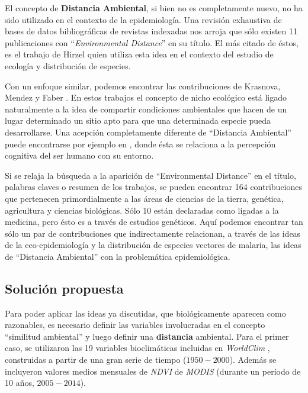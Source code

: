  \par El concepto de \textbf{Distancia Ambiental}, si bien no es completamente nuevo,
    no ha sido utilizado en el contexto de la epidemiología. Una revisión
    exhaustiva de bases de datos bibliográficas de revistas indexadas nos
    arroja que sólo existen 11 publicaciones con ``\textit{Environmental Distance}”
    en su título. El más citado de éstos, es el trabajo de Hirzel \cite{hirzel_distance}
    quien utiliza esta idea en el contexto del estudio de ecología y
    distribución de especies.

  \par Con un enfoque similar, podemos encontrar las contribuciones de Krasnova,
    Mendez y Faber \cite{krasnova_similarity, mendez_distance, farber_modeling}.
    En estos trabajos el concepto de nicho ecológico está ligado naturalmente a
    la idea de compartir condiciones ambientales que hacen de un lugar determinado
    un sitio apto para que una determinada especie pueda desarrollarse.
    Una acepción completamente diferente de ``Distancia Ambiental” puede
    encontrarse por ejemplo en \cite{montello_cognition}, donde ésta se relaciona
    a la percepción cognitiva del ser humano con su entorno.

  \par Si se relaja la búsqueda a la aparición de ``Environmental Distance” en el
    título, palabras claves o resumen de los trabajos, se pueden encontrar 164
    contribuciones que pertenecen primordialmente a las áreas de ciencias de la
    tierra, genética, agricultura y ciencias biológicas.
    Sólo 10 están declaradas como ligadas a la medicina, pero ésto es a través
    de estudios genéticos. Aquí podemos encontrar tan sólo un par de
    contribuciones \cite{tatem_env_coverage, altamirada_genetic} que
    indirectamente relacionan, a través de las ideas de la
    eco-epidemiología y la distribución de especies vectores de malaria,
    las ideas de ``Distancia Ambiental” con la problemática epidemiológica.

\subsection{Solución propuesta}
  \par Para poder aplicar las ideas ya discutidas, que biológicamente aparecen
    como razonables, es necesario definir las variables involucradas en el
    concepto ``similitud ambiental” y luego definir una \textbf{distancia} ambiental.
    Para el primer caso, se utilizaron las 19 variables bioclimáticas incluidas en
    \textit{WorldClim} \cite{wordclim}, construidas a partir de una gran serie
    de tiempo ($1950-2000$).
    Además se incluyeron valores medios mensuales de \textit{NDVI} de
    \textit{MODIS} (durante un período de 10 años, $2005-2014$).


